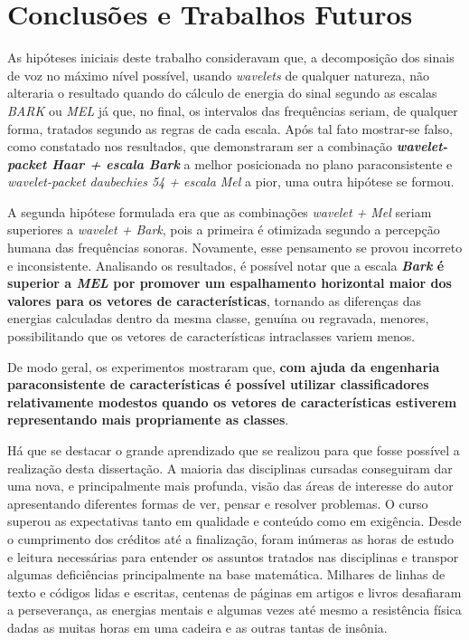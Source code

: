\chapter{Conclusões e Trabalhos Futuros} \label{chap:conclusions}
	\enableClearpage
	\par As hipóteses iniciais deste trabalho consideravam que, a decomposição dos sinais de voz no máximo nível possível, usando \textit{wavelets} de qualquer natureza, não alteraria o resultado quando do cálculo de energia do sinal segundo as escalas \textit{BARK} ou \textit{MEL} já que, no final, os intervalos das frequências seriam, de qualquer forma, tratados segundo as regras de cada escala. Após tal fato mostrar-se falso, como constatado nos resultados, que demonstraram ser a combinação \textbf{\textit{wavelet-packet Haar + escala Bark}} a melhor posicionada no plano paraconsistente e \textit{wavelet-packet daubechies 54 + escala Mel} a pior, uma outra hipótese se formou.
	
	\par A segunda hipótese formulada era que as combinações \textit{wavelet + Mel} seriam superiores a \textit{wavelet + Bark}, pois a primeira é otimizada segundo a percepção humana das frequências sonoras. Novamente, esse pensamento se provou incorreto e inconsistente. Analisando os resultados, é possível notar que a escala \textbf{\textit{Bark} é superior a \textit{MEL} por promover um espalhamento horizontal maior dos valores para os vetores de características}, tornando as diferenças das energias calculadas dentro da mesma classe, genuína ou regravada, menores, possibilitando que os vetores de características intraclasses variem menos.

    \par De modo geral, os experimentos mostraram que, \textbf{com ajuda da engenharia paraconsistente de características é possível utilizar classificadores relativamente modestos quando os vetores de características estiverem representando mais propriamente as classes}.
    
    \par Há que se destacar o grande aprendizado que se realizou para que fosse possível a realização desta dissertação. A maioria das disciplinas cursadas conseguiram dar uma nova, e principalmente mais profunda, visão das áreas de interesse do autor apresentando diferentes formas de ver, pensar e resolver problemas. O curso superou as expectativas tanto em qualidade e conteúdo como em exigência. Desde o cumprimento dos créditos até a finalização, foram inúmeras as horas de estudo e leitura necessárias para entender os assuntos tratados nas disciplinas e transpor algumas deficiências principalmente na base matemática. Milhares de linhas de texto e códigos lidas e escritas, centenas de páginas em artigos e livros desafiaram a perseverança, as energias mentais e algumas vezes até mesmo a resistência física dadas as muitas horas em uma cadeira e as outras tantas de insônia.
    
